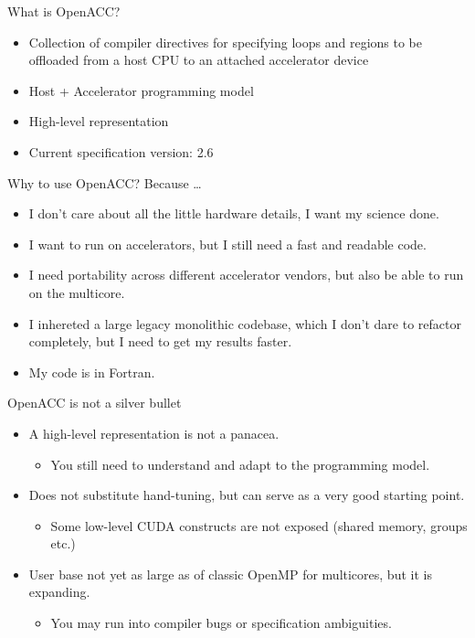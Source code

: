 \documentclass[12pt,aspectratio=169]{beamer}
\begin{document}
\begin{frame}{What is OpenACC?}
  \begin{itemize}
  \item Collection of compiler directives for specifying loops and regions to be
    offloaded from a host CPU to an attached accelerator device
  \item Host + Accelerator programming model
  \item High-level representation
  \item Current specification version: 2.6
  \end{itemize}
\end{frame}

\begin{frame}{Why to use OpenACC?}
  Because \dots
  \vspace\baselineskip
  \begin{itemize}
  \item I don't care about all the little hardware details, I want my science done.
  \item I want to run on accelerators, but I still need a fast and readable code.
  \item I need portability across different accelerator vendors, but also be able to run on the multicore.
  \item I inhereted a large legacy monolithic codebase, which I don't dare to
    refactor completely, but I need to get my results faster.
  \item My code is in Fortran.
  \end{itemize}
\end{frame}

\begin{frame}{OpenACC is not a silver bullet}
  \begin{itemize}
  \item A high-level representation is not a panacea.
    \begin{itemize}
    \item You still need to understand and adapt to the programming model.
    \end{itemize}
    \vfill
  \item Does not substitute hand-tuning, but can serve as a very good starting point.
    \begin{itemize}
    \item Some low-level CUDA constructs are not exposed (shared memory, groups etc.)
    \end{itemize}
    \vfill
  \item User base not yet as large as of classic OpenMP for multicores, but it is expanding.
    \begin{itemize}
    \item You may run into compiler bugs or specification ambiguities.
    \end{itemize}
  \end{itemize}
\end{frame}
\end{document}
